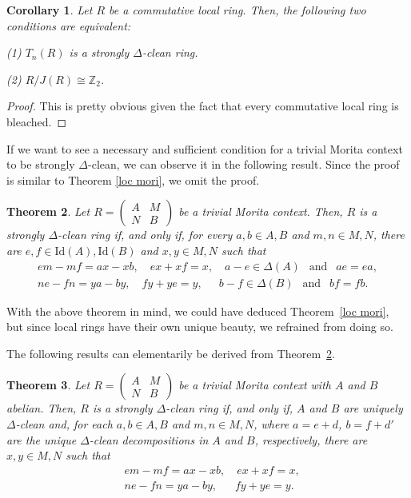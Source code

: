 \documentclass[12pt]{amsart}
\newtheorem{theorem}{Theorem}[section]
\newtheorem{corollary}[theorem]{Corollary}
\theoremstyle{definition}
\begin{document}
\begin{corollary}
Let $R$ be a commutative local ring. Then, the following two conditions are equivalent:
	
(1) $T_n(R)$ is a strongly $\Delta$-clean ring.
	
(2) \( R/J(R) \cong \mathbb{Z}_2 \).
\end{corollary}

\begin{proof}
This is pretty obvious given the fact that every commutative local ring is bleached.
\end{proof}

If we want to see a necessary and sufficient condition for a trivial Morita context to be strongly $\Delta$-clean, we can observe it in the following result. Since the proof is similar to Theorem \ref{loc mori}, we omit the proof.

\begin{theorem}\label{mor fin}
Let $R = \begin{pmatrix}
A & M \\
N & B
\end{pmatrix}$ be a trivial Morita context. Then, $R$ is a strongly $\Delta$-clean ring if, and only if, for every $a,b \in A,B$ and $m,n \in M,N$, there are $e,f \in \text{Id}(A),\text{Id}(B)$ and $x,y \in M,N$ such that
\begin{align*}
em - mf = ax - xb,\quad  ex + xf = x,\quad a - e \in \Delta(A) \:\:\text{ and } \:\: ae = ea, \\
ne - fn = ya - by,\quad  fy + ye = y, \: \:\quad b - f \in \Delta(B)\:\: \text{ and }\:\: bf = fb.
\end{align*}
\end{theorem}

With the above theorem in mind, we could have deduced Theorem~\ref{loc mori}, but since local rings have their own unique beauty, we refrained from doing so.

The following results can elementarily be derived from Theorem~\ref{mor fin}.

\begin{theorem}
Let $R = \begin{pmatrix}
A & M \\
N & B
\end{pmatrix}$ be a trivial Morita context with $A$ and $B$ abelian. Then, $R$ is a strongly $\Delta$-clean ring if, and only if, $A$ and $B$ are uniquely $\Delta$-clean and, for each $a,b \in A,B$ and $m,n \in M,N$, where $a = e + d$, $b = f + d'$ are the unique $\Delta$-clean decompositions in $A$ and $B$, respectively, there are $x,y \in M,N$ such that
\begin{align*}
&em - mf = ax - xb, \quad
ex + xf = x, \\
&ne - fn = ya - by, \quad\;\;
fy + ye = y.
\end{align*}
\end{theorem}
\end{document}
